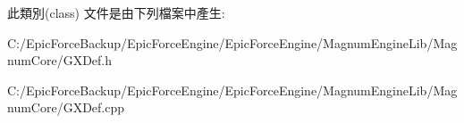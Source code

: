 此類別(class) 文件是由下列檔案中產生\+:\begin{DoxyCompactItemize}
\item 
C\+:/\+Epic\+Force\+Backup/\+Epic\+Force\+Engine/\+Epic\+Force\+Engine/\+Magnum\+Engine\+Lib/\+Magnum\+Core/G\+X\+Def.\+h\item 
C\+:/\+Epic\+Force\+Backup/\+Epic\+Force\+Engine/\+Epic\+Force\+Engine/\+Magnum\+Engine\+Lib/\+Magnum\+Core/G\+X\+Def.\+cpp\end{DoxyCompactItemize}
